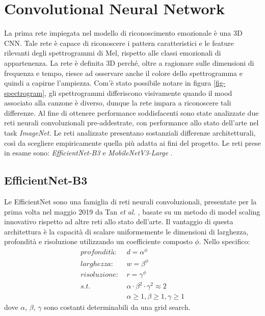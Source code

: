 \documentclass[11pt]{report}
\begin{document}
\section{Convolutional Neural Network}

La prima rete impiegata nel modello di riconoscimento emozionale è una 3D CNN. Tale rete è capace di riconoscere i pattern caratteristici e le feature rilevanti degli spettrogrammi di Mel, rispetto alle classi emozionali di appartenenza. La rete è definita 3D perché, oltre a ragionare sulle dimensioni di frequenza e tempo, riesce ad osservare anche il colore dello spettrogramma e quindi a capirne l'ampiezza. Com'è stato possibile notare in figura \ref{fig-spectrogram}, gli spettrogrammi differiscono visivamente quando il mood associato alla canzone è diverso, dunque la rete impara a riconoscere tali differenze.
Al fine di ottenere performance soddisfacenti sono state analizzate due reti neurali convoluzionali pre-addestrate, con performance allo stato dell'arte nel task \textit{ImageNet.} Le reti analizzate presentano sostanziali differenze architetturali, così da scegliere empiricamente quella più adatta ai fini del progetto. Le reti prese in esame sono: \textit{EfficientNet-B3} \cite{tan2019efficientnet} e \textit{MobileNetV3-Large} \cite{howard2019searching}.

\newpage

\subsection{EfficientNet-B3}


Le EfficientNet sono una famiglia di reti neurali convoluzionali, presentate per la prima volta nel maggio 2019 da Tan \textit{et al.} \cite{tan2019efficientnet}, basate su un metodo di model scaling innovativo rispetto ad altre reti allo stato dell'arte. Il vantaggio di questa architettura è la capacità di scalare uniformemente le dimensioni di larghezza, profondità e risoluzione utilizzando un coefficiente composto $\phi$. Nello specifico:
        \begin{equation}
            \begin{split}
                profondità:&\ d = \alpha^\phi\\
                larghezza:&\ w = \beta^\phi\\
                risoluzione:&\  r = \gamma^\phi\\
                s.t.&\ \alpha \cdot \beta^2 \cdot \gamma^2 \approx 2\\
                &\ \alpha\geq1, \beta\geq1, \gamma\geq1
            \end{split}
        \end{equation}
        dove $\alpha$, $\beta$, $\gamma$ sono costanti determinabili da una grid search.\\
        
\end{document}
